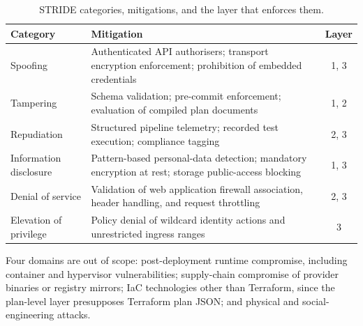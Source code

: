 \documentclass[smallextended]{svjour3}
\begin{document}
\begin{table}[!t]
\caption{STRIDE categories, mitigations, and the layer that enforces them.}
\label{tab:stride}
\centering
\small
\setlength{\tabcolsep}{4pt}
\begin{tabularx}{\linewidth}{l >{\raggedright\arraybackslash}X c}
\toprule
\textbf{Category} & \textbf{Mitigation} & \textbf{Layer} \\
\midrule
Spoofing & Authenticated API authorisers; transport encryption enforcement;
prohibition of embedded credentials & 1, 3 \\
\addlinespace[2pt]
Tampering & Schema validation; pre-commit enforcement; evaluation of compiled
plan documents & 1, 2 \\
\addlinespace[2pt]
Repudiation & Structured pipeline telemetry; recorded test execution; compliance
tagging & 2, 3 \\
\addlinespace[2pt]
Information disclosure & Pattern-based personal-data detection; mandatory
encryption at rest; storage public-access blocking & 1, 3 \\
\addlinespace[2pt]
Denial of service & Validation of web application firewall association, header
handling, and request throttling & 2, 3 \\
\addlinespace[2pt]
Elevation of privilege & Policy denial of wildcard identity actions and
unrestricted ingress ranges & 3 \\
\bottomrule
\end{tabularx}
\end{table}

Four domains are out of scope: post-deployment runtime compromise, including
container and hypervisor vulnerabilities; supply-chain compromise of provider
binaries or registry mirrors; IaC technologies other than Terraform, since the
plan-level layer presupposes Terraform plan JSON; and physical and
social-engineering attacks.


\end{document}
